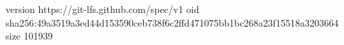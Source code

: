 version https://git-lfs.github.com/spec/v1
oid sha256:49a3519a3ed44d153590ceb738f6c2ffd471075bb1bc268a23f15518a3203664
size 101939
